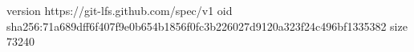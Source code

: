 version https://git-lfs.github.com/spec/v1
oid sha256:71a689dff6f407f9e0b654b1856f0fc3b226027d9120a323f24c496bf1335382
size 73240
